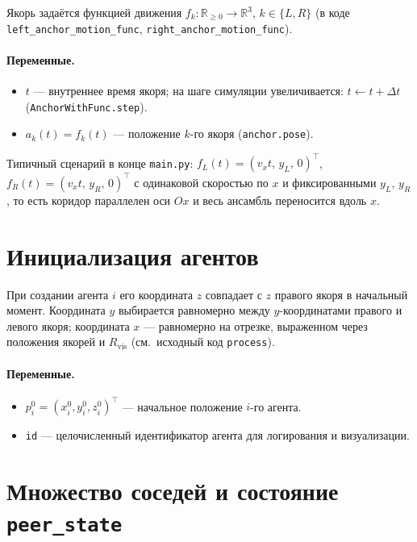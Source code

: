 \documentclass[12pt,a4paper]{article}
\begin{document}
Якорь задаётся функцией движения $f_k: \mathbb{R}_{\ge 0} \to \mathbb{R}^3$, $k \in \{L,R\}$ (в коде \texttt{left\_anchor\_motion\_func}, \texttt{right\_anchor\_motion\_func}).

\paragraph{Переменные.}
\begin{itemize}
  \item $t$ --- внутреннее время якоря; на шаге симуляции увеличивается: $t \leftarrow t + \Delta t$ (\texttt{AnchorWithFunc.step}).
  \item $a_k(t) = f_k(t)$ --- положение $k$-го якоря (\texttt{anchor.pose}).
\end{itemize}

Типичный сценарий в конце \texttt{main.py}: $f_L(t) = (v_x t,\, y_L,\, 0)^\top$, $f_R(t) = (v_x t,\, y_R,\, 0)^\top$ с одинаковой скоростью по $x$ и фиксированными $y_L$, $y_R$, то есть коридор параллелен оси $Ox$ и весь ансамбль переносится вдоль $x$.

\section{Инициализация агентов}

При создании агента $i$ его координата $z$ совпадает с $z$ правого якоря в начальный момент. Координата $y$ выбирается равномерно между $y$-координатами правого и левого якоря; координата $x$ --- равномерно на отрезке, выраженном через положения якорей и $R_{\mathrm{vis}}$ (см.\ исходный код \texttt{process}).

\paragraph{Переменные.}
\begin{itemize}
  \item $p_i^0 = (x_i^0, y_i^0, z_i^0)^\top$ --- начальное положение $i$-го агента.
  \item \texttt{id} --- целочисленный идентификатор агента для логирования и визуализации.
\end{itemize}

\section{Множество соседей и состояние \texttt{peer\_state}}
\label{sec:peers}
\end{document}
